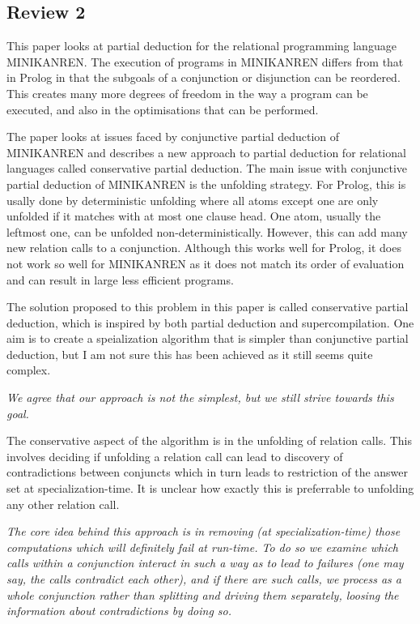 
\subsection*{Review 2}

This paper looks at partial deduction for the relational programming language  MINIKANREN. The execution of programs in MINIKANREN differs from that in Prolog in that the subgoals of a conjunction or disjunction can be reordered. This creates many more degrees of freedom in the way a program can be executed, and also in the optimisations that can be performed.

The paper looks at issues faced by conjunctive partial deduction of MINIKANREN and describes a new approach to partial deduction for relational languages called conservative partial deduction. The main issue with conjunctive partial deduction of MINIKANREN is the unfolding strategy. For Prolog, this is usally done by deterministic unfolding where all atoms except one are only unfolded if it matches with at most one clause head. One atom, usually the leftmost one, can be unfolded non-deterministically. However, this can add many new relation calls to a conjunction. Although this works well for Prolog, it does not work so well for MINIKANREN as it does not match its order of evaluation and can result in large less efficient programs.


The solution proposed to this problem in this paper is called conservative partial deduction, which is inspired by both partial deduction and supercompilation. One aim is to create a speialization algorithm that is simpler than conjunctive partial deduction, but I am not sure this has been achieved as it still seems quite complex.

\emph{We agree that our approach is not the simplest, but we still strive towards this goal.}

The conservative aspect of the algorithm is in the unfolding of relation calls. This involves deciding if unfolding a relation call can lead to discovery of contradictions between conjuncts which in turn leads to restriction of the answer set at specialization-time. It is unclear how exactly this is preferrable to unfolding any other relation call.

\emph{The core idea behind this approach is in removing (at specialization-time) those computations which will definitely fail at run-time. To do so we examine which calls within a conjunction interact in such a way as to lead to failures (one may say, the calls contradict each other), and if there are such calls, we process as a whole conjunction rather than splitting and driving them separately, loosing the information about contradictions by doing so.}


